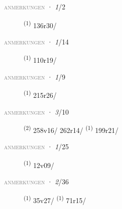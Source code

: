 \textsc{\textcolor{gray}{anmerkungen}}
\ENTRYEND
\noindent{} · \textit{1}/2 \LEMMALINE
\begin{description}
    \item[]  \textsuperscript{(1)} \mbox{136r30/}
\end{description}
\textsc{\textcolor{gray}{anmerkungen}}
\ENTRYEND
\noindent{} · \textit{1}/14 \LEMMALINE
\begin{description}
    \item[]  \textsuperscript{(1)} \mbox{110r19/}
\end{description}
\textsc{\textcolor{gray}{anmerkungen}}
\ENTRYEND
\noindent{} · \textit{1}/9 \LEMMALINE
\begin{description}
    \item[]  \textsuperscript{(1)} \mbox{215r26/}
\end{description}
\textsc{\textcolor{gray}{anmerkungen}}
\ENTRYEND
\noindent{} · \textit{3}/10 \LEMMALINE
\begin{description}
    \item[]  \textsuperscript{(2)} \mbox{258v16/} \mbox{262r14/} \CASEBREAK {} \textsuperscript{(1)} \mbox{199r21/}
\end{description}
\textsc{\textcolor{gray}{anmerkungen}}
\ENTRYEND
\noindent{} · \textit{1}/25 \LEMMALINE
\begin{description}
    \item[]  \textsuperscript{(1)} \mbox{12v09/}
\end{description}
\textsc{\textcolor{gray}{anmerkungen}}
\ENTRYEND
\noindent{} · \textit{2}/36 \LEMMALINE
\begin{description}
    \item[]  \textsuperscript{(1)} \mbox{35v27/} \textsuperscript{(1)} \mbox{71r15/}
\end{description}
